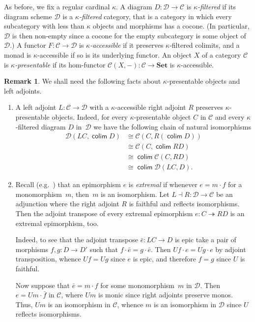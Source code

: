 \documentclass[sigconf,
			final%
			nonacm
                        ]{acmart}
\numberwithin{equation}{section}
\numberwithin{equation}{section}
\theoremstyle{plain}
\theoremstyle{definition}
\newtheorem{rem}[thm]{Remark}
\newcommand{\epito}{\twoheadrightarrow}
\newcommand{\CatC}{\mathscr{C}}           %
\newcommand{\CatD}{\mathscr{D}}
\newcommand{\Set}{\mathbf{Set}}
\DeclareMathOperator{\colim}{\mathsf{colim}}    %
\begin{document}
As before, we fix a regular cardinal $\kappa$. A diagram
\mbox{$D\colon \CatD \to \CatC$} is \emph{$\kappa$-filtered} if its diagram
scheme $\CatD$ is a \emph{$\kappa$-filtered} category, that is a
category in which every subcategory with less than $\kappa$ objects
and morphisms has a cocone. (In particular, $\CatD$ is then non-empty
since a cocone for the empty subcategory is some object of $\CatD$.) A
functor $F\colon \CatC \to \CatD$ is \emph{$\kappa$-accessible} if it
preserves $\kappa$-filtered colimits, and a monad is
$\kappa$-accessible if so is its underlying functor. An object $X$ of
a category $\CatC$ is \emph{$\kappa$-presentable} if its hom-functor
$\CatC(X,-)\colon \CatC \to \Set$ is $\kappa$-accessible.
%
\begin{rem}\label{R:adj}
  We shall need the following facts about $\kappa$-presentable
  objects and left adjoints.
  \begin{enumerate}
  \item\label{R:adj:1} A left adjoint $L\colon \CatC \to \CatD$ with a $\kappa$-accessible right adjoint
    $R$ preserves $\kappa$-presentable objects. Indeed, for every
    $\kappa$-presentable object $C$ in $\CatC$ and every
    $\kappa$-filtered diagram $D$ in~$\CatD$ we have the following chain
    of natural isomorphisms
    \begin{align*}
      \CatD(LC, \colim D) &\cong \CatC(C, R(\colim D)) \\
      &\cong \CatC(C, \colim RD) \\
      &\cong \colim \CatC(C, RD) \\
      &\cong \colim \CatD(LC, D).
    \end{align*}

  \item\label{R:adj:2} Recall (e.g.~\cite[Def.~7.74]{AHS90}) that an
    epimorphism $e$ is \emph{extremal} if whenever $e = m \cdot f$ for
    a monomorphism~$m$, then~$m$ is an isomorphism. Let
    $L \dashv R\colon \CatD \to \CatC$ be an adjunction where the
    right adjoint $R$ is faithful and reflects isomorphisms. Then the
    adjoint transpose of every extremal epimorphism $e\colon C \epito RD$
    is an extremal epimorphism, too.

    Indeed, to see that the adjoint transpose $\bar e\colon LC \to D$
    is epic take a pair of morphisms $f, g\colon D \to D'$ such that
    $f \cdot \bar e = g \cdot \bar e$. Then $Uf \cdot e = Ug \cdot e$
    by adjoint transposition, whence $Uf = Ug$ since $e$ is epic, and
    therefore $f= g$ since $U$ is faithful.

    Now suppose that $\bar e = m \cdot f$ for some monomorphism~$m$ in
    $\CatD$. Then $e = Um \cdot \bar f$ in $\CatC$, where $Um$ is
    monic since right adjoints preserve monos. Thus, $Um$ is an
    isomorphism in $\CatC$, whence $m$ is an isomorphism in $\CatD$
    since $U$ reflects isomorphisms.
  \end{enumerate}
\end{rem}
\end{document}
